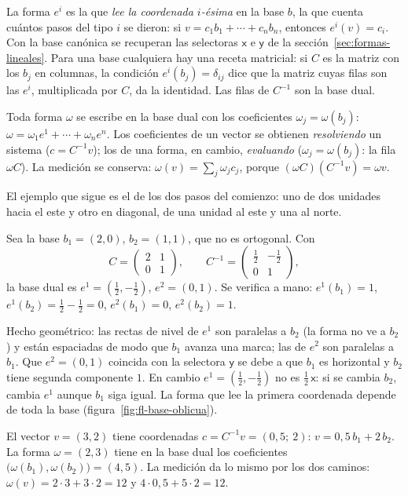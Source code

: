 La forma \(e^i\) es la que \emph{lee la coordenada \(i\)-ésima} en la base \(b\), la que cuenta cuántos pasos del tipo \(i\) se dieron: si
\(v=c_1b_1+\cdots+c_nb_n\), entonces \(e^i(v)=c_i\). Con la base canónica se recuperan las
selectoras \(\mathsf{x}\) e \(\mathsf{y}\) de la sección~\ref{sec:formas-lineales}. Para
una base cualquiera hay una receta matricial: si \(C\) es la matriz con los \(b_j\) en
columnas, la condición \(e^i(b_j)=\delta_{ij}\) dice que la matriz cuyas filas son las
\(e^i\), multiplicada por \(C\), da la identidad. Las filas de \(C^{-1}\) son la base dual.

Toda forma \(\omega\) se escribe en la base dual con los coeficientes
\(\omega_j=\omega(b_j)\): \(\omega=\omega_1e^1+\cdots+\omega_ne^n\). Los coeficientes de un
vector se obtienen \emph{resolviendo} un sistema (\(c=C^{-1}v\)); los de una forma, en
cambio, \emph{evaluando} (\(\omega_j=\omega(b_j)\): la fila \(\omega C\)). La medición se
conserva: \(\omega(v)=\sum_j\omega_jc_j\), porque \((\omega C)(C^{-1}v)=\omega v\).

El ejemplo que sigue es el de los dos pasos del comienzo: uno de dos unidades hacia el este
y otro en diagonal, de una unidad al este y una al norte.

\begin{ejemplo}\label{ej:fl-base-dual}
Sea la base \(b_1=(2,0)\), \(b_2=(1,1)\), que no es ortogonal. Con
\[
  C=\begin{pmatrix}2&1\\0&1\end{pmatrix},\qquad
  C^{-1}=\begin{pmatrix}\tfrac12&-\tfrac12\\0&1\end{pmatrix},
\]
la base dual es \(e^1=(\tfrac12,-\tfrac12)\), \(e^2=(0,1)\). Se verifica a mano:
\(e^1(b_1)=1\), \(e^1(b_2)=\tfrac12-\tfrac12=0\), \(e^2(b_1)=0\), \(e^2(b_2)=1\).

Hecho geométrico: las rectas de nivel de \(e^1\) son paralelas a \(b_2\) (la forma no ve a
\(b_2\)) y están espaciadas de modo que \(b_1\) avanza una marca; las de \(e^2\) son
paralelas a \(b_1\). Que \(e^2=(0,1)\) coincida con la selectora \(\mathsf{y}\) se debe a
que \(b_1\) es horizontal y \(b_2\) tiene segunda componente \(1\). En cambio
\(e^1=(\tfrac12,-\tfrac12)\) no es \(\tfrac12\,\mathsf{x}\): si se cambia \(b_2\), cambia \(e^1\)
aunque \(b_1\) siga igual. La forma que lee la primera coordenada depende de toda la base
(figura~\ref{fig:fl-base-oblicua}).

El vector \(v=(3,2)\) tiene coordenadas \(c=C^{-1}v=(0{,}5;\ 2)\): \(v=0{,}5\,b_1+2\,b_2\).
La forma \(\omega=(2,3)\) tiene en la base dual los coeficientes
\(\bigl(\omega(b_1),\omega(b_2)\bigr)=(4,5)\). La medición da lo mismo por los dos caminos:
\(\omega(v)=2\cdot3+3\cdot2=12\) y \(4\cdot0{,}5+5\cdot2=12\).
\end{ejemplo}

